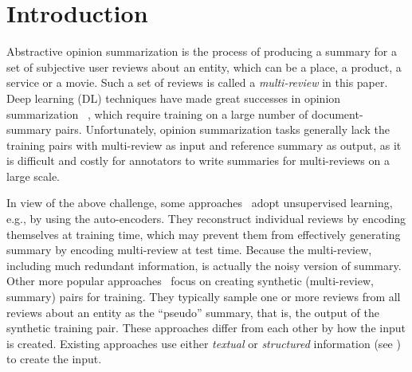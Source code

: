 \section{Introduction}
\label{sec:intro}


Abstractive opinion summarization is the process of 
producing a summary for a set of 
subjective user reviews about an entity, which can be 
a place, a product, a service or a movie. 
Such a set of reviews is called a {\em multi-review} in this paper. 
Deep learning (DL) techniques have made great successes 
in opinion summarization
~\cite{NallapatiZSGX16,SeeLM17,LiuLZ18,CelikyilmazBHC18,BART20,liu2021keyword,multisumSIG21}, 
which require training on a large number of document-summary pairs.
Unfortunately, opinion summarization tasks
generally lack the training pairs with multi-review as input and reference summary as output,
as it is difficult and costly for annotators to write summaries for 
multi-reviews on a large scale.

In view of the above challenge, some approaches~\cite{MeanSum19,Copycat20,tree21}
adopt unsupervised learning, e.g., by using the auto-encoders.
They reconstruct individual reviews by encoding themselves
at training time, 
which may prevent them from effectively generating summary by encoding multi-review at test time.
Because the multi-review, including much redundant information, is actually the noisy version of summary.
Other more popular approaches~\cite{Denoise20,Fewshot20,Plansum20,transsum21} 
focus on creating synthetic (multi-review, summary) pairs for training.
They typically sample one or more reviews from all reviews 
about an entity
as the ``pseudo'' summary, that is, the output of the synthetic training pair.
These approaches differ from each other by how the input is created.
Existing approaches use either {\em textual} or  {\em structured} information (see )
to create the input.

